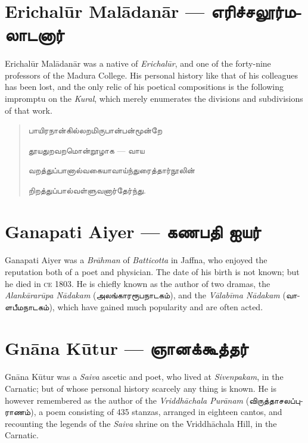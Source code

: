 \documentclass{article}
\newcommand{\TamilText}[1]{\texttamil{#1}}
\newcommand{\TamilBold}[1]{\texttamil{\textbf{#1}}}
\newcommand{\tam}[1]{\TamilText{#1}}
\newcommand{\tambold}[1]{\TamilBold{#1}}
\begin{document}
\section{Erichal\={u}r Mal\={a}dan\={a}r --- \tambold{எரிச்சலூர்மலாடனார்}}
\paragraph{}
Erichal\={u}r Mal\={a}dan\={a}r was a native of \emph{Erichal\={u}r}, and one of the forty-nine professors of the Madura College. His personal history like that of his colleagues has been lost, and the only relic of his poetical compositions is the following impromptu on the \emph{Kural}, which merely enumerates the divisions and subdivisions of that work.
\begin{quotation}\small
\tam{பாயிரநான்கில்லறமிருபான்பன்மூன்றே}

\tam{தூயதுறவறமொன்றூழாக} --- \tam{வாய}

\tam{வறத்துப்பானால்வகையாவாய்ந்துரைத்தார்நூலின்‌}

\tam{றிறத்துப்பால்‌வள்‌ளுவனார்தேர்‌ந்து}.
\end{quotation}

\section{Ganapati Aiyer --- \tambold{கணபதி ஐயர்}}
\paragraph{}
Ganapati Aiyer was a \emph{Br\={a}hman} of \emph{Batticotta} in Jaffna, who enjoyed the reputation both of a poet and physician. The date of his birth is not known; but he died in \textsc{ce} 1803. He is chiefly known as the author of two dramas, the \emph{Alank\={a}rar\={u}pa N\={a}dakam} (\tam{அலங்காரரூபநாடகம்}), and the \emph{V\={a}lab\={i}ma N\={a}dakam} (\tam{வாளபீமநாடகம்}), which have gained much popularity and are often acted.

\section{Gn\={a}na K\={u}tur --- \tambold{ஞானக்கூத்தர்}}
\paragraph{}
Gn\={a}na K\={u}tur was a \emph{Saiva} ascetic and poet, who lived at \emph{Sivenpakam}, in the Carnatic; but of whose personal history scarcely any thing is known. He is however remembered as the author of the \emph{Vriddh\={a}chala Pur\={a}nam} (\tam{விருத்தாசலப்புராணம்}), a poem consisting of 435 stanzas, arranged in eighteen cantos, and recounting the legends of the \emph{Saiva} shrine on the Vriddh\={a}chala Hill, in the Carnatic.
\end{document}
